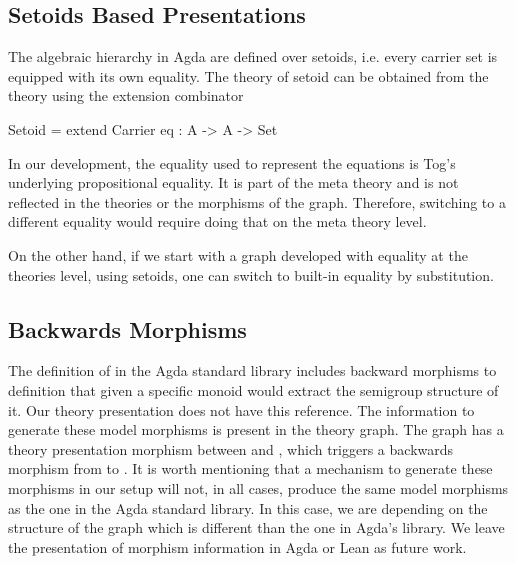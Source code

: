 \subsection{Setoids Based Presentations}
\label{subsec:setoid-based-pres}
The algebraic hierarchy in Agda are defined over setoids, i.e. every carrier set is equipped with its own equality. 
The theory of setoid can be obtained from the  theory using the extension combinator 
\begin{togcode}
Setoid = extend Carrier {eq : A -> A -> Set}
\end{togcode}
In our development, the equality used to represent the equations is Tog's underlying propositional equality. It is part of the meta theory and is not reflected in the theories or the morphisms of the graph. Therefore, switching to a different equality would require doing that on the meta theory level. 

On the other hand, if we start with a graph developed with equality at the theories level, using setoids, one can switch to built-in equality by substitution. 





\subsection{Backwards Morphisms} 
\label{subsec:model-morph}
\label{subsec:agda:modelMorphisms}
The definition of  in the Agda standard library includes backward morphisms to   definition that given a specific monoid would extract the semigroup structure of it. Our theory presentation does not have this reference. The information to generate these model morphisms is present in the theory graph. The graph has a theory presentation morphism between  and , which triggers a backwards morphism from  to . It is worth mentioning that a mechanism to generate these morphisms in our setup will not, in all cases, produce the same model morphisms as the one in the Agda standard library. In this case, we are depending on the structure of the graph which is different than the one in Agda's library. We leave the presentation of morphism information in Agda or Lean as future work. 

